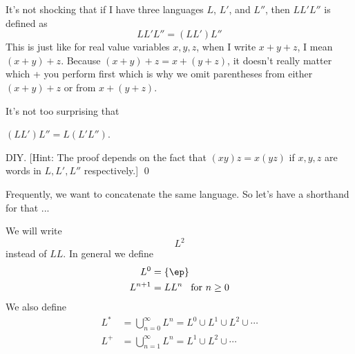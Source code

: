 







\newpage
It's not shocking that if I have three languages $L$, $L'$, and $L''$,
then $LL'L''$ is defined as
\[
LL'L'' = (LL')L''
\]
This is just like for real value variables $x,y,z$, when I write
$x + y + z$, I mean $(x + y) + z$.
Because $(x + y) + z = x + (y + z)$, it doesn't really matter
which + you perform first which is why we omit parentheses
from either $(x + y) + z$ or from $x + (y + z)$.

It's not too surprising that

\begin{prop}
$(LL')L'' = L(L'L'')$.
\end{prop}

\proof
DIY.
[Hint: The proof depends on the fact that $(xy)z = x(yz)$ if
$x,y,z$ are words in $L,L',L''$ respectively.]
\qed


\newpage
Frequently, we want to concatenate the same language.
So let's have a shorthand for that ...

We will write 
\[
L^2
\]
instead of $LL$.
In general we define
\begin{align*}
L^0 &= \{\ep\} \\
L^{n+1} &= L L^n \,\,\, \text{ for } n \geq 0
\end{align*}
We also define
\begin{align*}
L^* &= \bigcup_{n = 0}^\infty L^n = L^0 \cup L^1 \cup L^2 \cup \cdots \\
L^+ &= \bigcup_{n = 1}^\infty L^n = L^1 \cup L^2 \cup \cdots \\
\end{align*}









